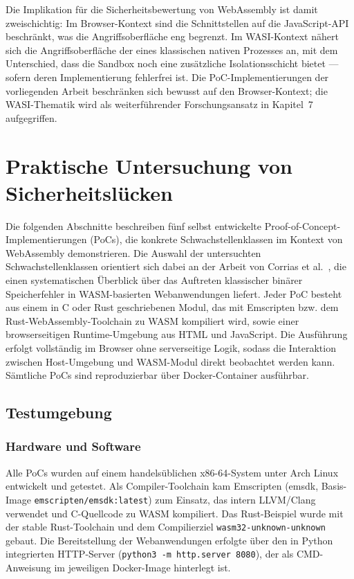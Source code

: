 Die Implikation für die Sicherheitsbewertung von WebAssembly ist damit zweischichtig: Im Browser-Kontext sind die Schnittstellen auf die JavaScript-API beschränkt, was die Angriffsoberfläche eng begrenzt. Im WASI-Kontext nähert sich die Angriffsoberfläche der eines klassischen nativen Prozesses an, mit dem Unterschied, dass die Sandbox noch eine zusätzliche Isolationsschicht bietet --- sofern deren Implementierung fehlerfrei ist. Die PoC-Implementierungen der vorliegenden Arbeit beschränken sich bewusst auf den Browser-Kontext; die WASI-Thematik wird als weiterführender Forschungsansatz in Kapitel~7 aufgegriffen.

\clearpage

\section{Praktische Untersuchung von Sicherheitslücken}

Die folgenden Abschnitte beschreiben fünf selbst entwickelte Proof-of-Concept-Implementierungen (PoCs), die konkrete Schwachstellenklassen im Kontext von WebAssembly demonstrieren. Die Auswahl der untersuchten Schwachstellenklassen orientiert sich dabei an der Arbeit von Corrias et al.~\cite{corrias2026analysis}, die einen systematischen Überblick über das Auftreten klassischer binärer Speicherfehler in WASM-basierten Webanwendungen liefert. Jeder PoC besteht aus einem in C oder Rust geschriebenen Modul, das mit Emscripten bzw. dem Rust-WebAssembly-Toolchain zu WASM kompiliert wird, sowie einer browserseitigen Runtime-Umgebung aus HTML und JavaScript. Die Ausführung erfolgt vollständig im Browser ohne serverseitige Logik, sodass die Interaktion zwischen Host-Umgebung und WASM-Modul direkt beobachtet werden kann. Sämtliche PoCs sind reproduzierbar über Docker-Container ausführbar.

\subsection{Testumgebung}

\subsubsection{Hardware und Software}

Alle PoCs wurden auf einem handelsüblichen x86-64-System unter Arch Linux entwickelt und getestet. Als Compiler-Toolchain kam Emscripten (emsdk, Basis-Image \texttt{emscripten/emsdk:latest}) zum Einsatz, das intern LLVM/Clang verwendet und C-Quellcode zu WASM kompiliert. Das Rust-Beispiel wurde mit der stable Rust-Toolchain und dem Compilierziel \texttt{wasm32-unknown-unknown} gebaut. Die Bereitstellung der Webanwendungen erfolgte über den in Python integrierten HTTP-Server (\texttt{python3 -m http.server 8080}), der als CMD-Anweisung im jeweiligen Docker-Image hinterlegt ist.

